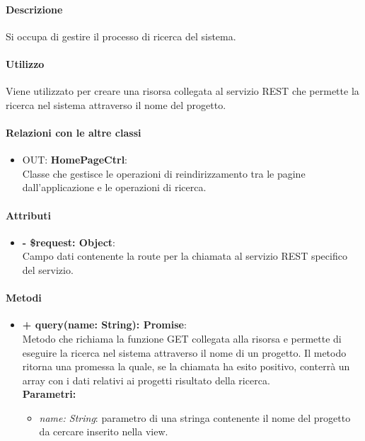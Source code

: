 		\paragraph{Descrizione}
		Si occupa di gestire il processo di ricerca del sistema.
		
		\paragraph{Utilizzo}
		Viene utilizzato per creare una risorsa collegata al servizio REST che permette la ricerca nel sistema attraverso il nome del progetto.
		
		\paragraph{Relazioni con le altre classi}
		\begin{itemize}
			\item OUT: \textbf{HomePageCtrl}:\\
			Classe che gestisce le operazioni di reindirizzamento tra le pagine dall'applicazione e le operazioni di ricerca.
		\end{itemize}
		
		\paragraph{Attributi}
		\begin{itemize}
			\item \textbf{- \$request: Object}:\\
			Campo dati contenente la route per la chiamata al servizio REST specifico del servizio.
		\end{itemize}	
		
		\paragraph{Metodi}
		\begin{itemize}
			\item \textbf{+ query(name: String): Promise}:\\
			Metodo che richiama la funzione GET collegata alla risorsa e permette di eseguire la ricerca nel sistema attraverso il nome di un progetto. Il metodo ritorna una promessa la quale, se la chiamata ha esito positivo, conterrà un array con i dati relativi ai progetti risultato della ricerca.\\
			\textbf{Parametri:}\\
			\begin{itemize}
				\item \textit{name: String}: parametro di una stringa contenente il nome del progetto da cercare inserito nella view.
			\end{itemize}
		\end{itemize}
\newpage
		
